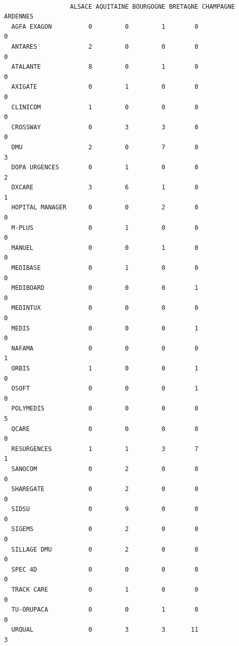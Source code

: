 \documentclass[]{article}
\begin{document}
\begin{verbatim}
                 
                  ALSACE AQUITAINE BOURGOGNE BRETAGNE CHAMPAGNE ARDENNES
  AGFA EXAGON          0         0         1        0                  0
  ANTARES              2         0         0        0                  0
  ATALANTE             8         0         1        0                  0
  AXIGATE              0         1         0        0                  0
  CLINICOM             1         0         0        0                  0
  CROSSWAY             0         3         3        0                  0
  DMU                  2         0         7        0                  3
  DOPA URGENCES        0         1         0        0                  2
  DXCARE               3         6         1        0                  1
  HOPITAL MANAGER      0         0         2        0                  0
  M-PLUS               0         1         0        0                  0
  MANUEL               0         0         1        0                  0
  MEDIBASE             0         1         0        0                  0
  MEDIBOARD            0         0         0        1                  0
  MEDINTUX             0         0         0        0                  0
  MEDIS                0         0         0        1                  0
  NAFAMA               0         0         0        0                  1
  ORBIS                1         0         0        1                  0
  OSOFT                0         0         0        1                  0
  POLYMEDIS            0         0         0        0                  5
  QCARE                0         0         0        0                  0
  RESURGENCES          1         1         3        7                  1
  SANOCOM              0         2         0        0                  0
  SHAREGATE            0         2         0        0                  0
  SIDSU                0         9         0        0                  0
  SIGEMS               0         2         0        0                  0
  SILLAGE DMU          0         2         0        8                  0
  SPEC 4D              0         0         0        0                  0
  TRACK CARE           0         1         0        0                  0
  TU-ORUPACA           0         0         1        0                  0
  URQUAL               0         3         3       11                  3
                 

\end{verbatim}
\end{document}
